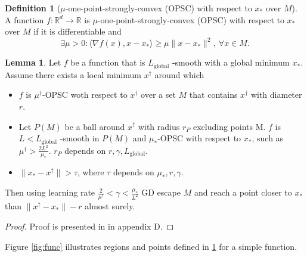 \documentclass{article}
\theoremstyle{definition}
\newtheorem{definition}{Definition}[section]
\newtheorem{lemma}[theorem]{Lemma}
\begin{document}
\begin{definition}[$\mu$-one-point-strongly-convex (OPSC) with respect to $x_\ast$ over $M$]
    A function $f: \mathbb{R}^d \rightarrow \mathbb{R}$ is 
    $\mu$-one-point-strongly-convex (OPSC) with respect to $x_\ast$ over $M$ 
    if it is differentiable and 
    $$\exists \mu > 0: \langle \nabla f(x), x - x_\ast \rangle \geq \mu \| x - x_\ast\|^2, \: \forall x \in M.$$
\end{definition}

\begin{lemma}\label{lma1}
    Let $f$ be a function that is 
    $L_{\mathrm{global}}$ -smooth with a global minimum $x_\ast$. 
    Assume there exists a local minimum $x^\dagger$ around which
    \begin{itemize}
        \item $f$ is $\mu^\dagger$-OPSC woth respect to 
        $x^\dagger$ over a set $M$ that contains $x^\dagger$ with diameter $r$.
        
        \item Let $P(M)$ be a ball around $x^\dagger$ with radius 
        $r_P$ excluding points M. $f$ is 
        $L < L_{\mathrm{global}}$ -smooth in $P(M)$ and 
        $\mu_\ast$-OPSC with respect to $x_\ast$, 
        such as $\mu^\dagger > \frac{2L^2}{\mu_\ast}$. 
        $r_P$ depends on $r, \gamma, L_{\mathrm{global}}$.

        \item $\| x_\ast - x^\dagger \| > \tau$, where $\tau$ depends on $\mu_\ast, r, \gamma$. 
    \end{itemize}

        Then using learning rate $\frac{2}{\mu^\dagger} < \gamma < \frac{\mu_\ast}{L^2}$
        GD escape $M$ and reach a point closer to $x_\ast$ than 
        $\| x^\dagger - x_\ast\| - r$ almost surely. 

\end{lemma}
\begin{proof}
    Proof is presented in \cite{mohtashami2023special} in appendix D.
\end{proof}


Figure \cref{fig:func} illustrates regions and points defined in \cref{lma1} for a simple function.
\end{document}
